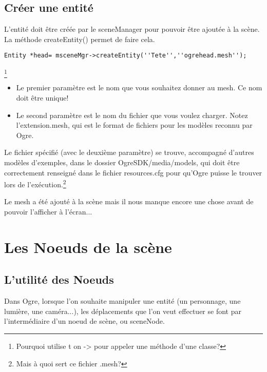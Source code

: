 \subsection{Cr\'eer une entit\'e}

L'entit\'e doit \^etre cr\'e\'ee par le sceneManager pour pouvoir \^etre ajout\'ee \`{a} la sc\`ene. La m\'ethode createEntity() permet de faire cela.
\begin{lstlisting}
Entity *head= msceneMgr->createEntity(''Tete'',''ogrehead.mesh'');
\end{lstlisting}\footnote{Pourquoi utilise t on -> pour appeler une m\'ethode d'une classe?}

\begin{itemize}
\item Le premier param\`etre est le nom que vous souhaitez donner au mesh. Ce nom doit \^etre unique!
\item Le second param\`etre est le nom du fichier que vous voulez charger. Notez l'extension.mesh, qui est le format de fichiers pour les mod\`eles reconnu par Ogre.
\end{itemize}




Le fichier sp\'ecifi\'e (avec le deuxi\`eme param\`etre) se trouve, accompagn\'e d'autres mod\`eles d'exemples, dans le dossier OgreSDK/media/models, qui doit \^etre correctement renseign\'e dans le fichier resources.cfg pour qu'Ogre puisse le trouver lors de l'ex\'ecution.\footnote{Mais \`a quoi sert ce fichier .mesh?}

Le mesh a \'et\'e ajout\'e \`{a} la sc\`ene mais il nous manque encore une chose avant de pouvoir l'afficher \`{a} l'\'ecran...













\section{Les Noeuds de la sc\`ene}



\subsection{L'utilit\'e des Noeuds}

Dans Ogre, lorsque l'on souhaite manipuler une entit\'e (un personnage, une lumi\`ere, une cam\'era...), les d\'eplacements que l'on veut effectuer se font par l'interm\'ediaire d'un noeud de sc\`ene, ou sceneNode.

